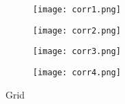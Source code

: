 \documentclass[12pt]{article}
\begin{document}
\begin{figure}[b]
    \centering
    \begin{subfigure}{.5\textwidth}
        \centering
        \texttt{[image: corr1.png]}
    \end{subfigure}%
    \begin{subfigure}{.5\textwidth}
        \centering
        \texttt{[image: corr2.png]}
    \end{subfigure}
    \begin{subfigure}{.5\textwidth}
        \centering
        \texttt{[image: corr3.png]}
    \end{subfigure}%
    \begin{subfigure}{.5\textwidth}
        \centering
        \texttt{[image: corr4.png]}
    \end{subfigure}%
    \caption[short]{Grid}
    \end{figure}
    
\end{document}
